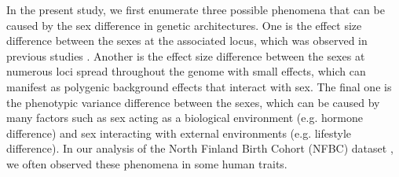 \documentclass[11pt]{article}
\begin{document}
In the present study, we first enumerate three possible phenomena that can be caused by
the sex difference in genetic architectures.
One is the effect size difference between the sexes at the associated locus,
which was observed in previous studies \citep{Randall:PlosGenet:2013}.
Another is the effect size difference between the sexes at 
numerous loci spread throughout the genome with small effects, %
which can manifest as 
polygenic background effects that interact with sex.
The final one is the phenotypic variance difference between the sexes,
which can be caused by many factors such as sex acting as a biological environment (e.g. hormone difference)
and sex interacting with external environments (e.g. lifestyle difference). 
In our analysis of the North Finland Birth Cohort (NFBC) dataset \citep{Sabatti:NatGenet:2009}, 
we often observed these phenomena in some human traits.
\end{document}
